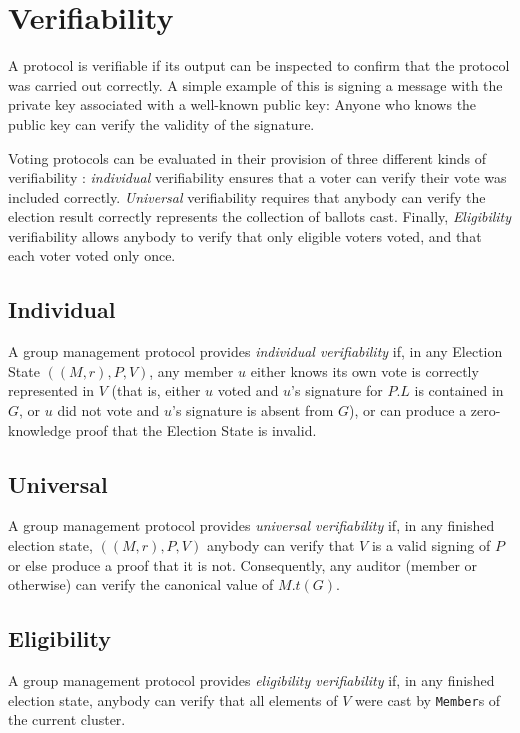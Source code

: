 \section{Verifiability}\label{Subsection:verif}
A protocol is verifiable if its output can be inspected to confirm that the
protocol was carried out correctly. A simple example of this is signing a
message with the private key associated with a well-known public key: Anyone
who knows the public key can verify the validity of the signature.

Voting protocols can be evaluated in their provision of three different
kinds of verifiability \cite{kremer_election_2010}: \emph{individual}
verifiability ensures that a voter can verify their vote was included
correctly. \emph{Universal} verifiability requires that anybody can verify
the election result correctly represents the collection of ballots cast.
Finally, \emph{Eligibility} verifiability allows anybody to verify that
only eligible voters voted, and that each voter voted only once.

  \subsection{Individual}
  A group management protocol provides \emph{individual verifiability} if, in
  any Election State $((M,r), P, V)$, any member $u$
  either knows its own vote is correctly represented in $V$ (that is, either
  $u$ voted and $u$'s
  signature for $P.L$ is contained in $G$,
  or $u$ did not vote and $u$'s signature is absent from $G$), or can produce
  a zero-knowledge proof that the Election State is invalid.

  \subsection{Universal}
  A group management protocol provides \emph{universal verifiability} if, in
  any finished election state, $((M,r), P, V)$%
  anybody can verify that $V$ is a valid signing of $P$ or else produce a
  proof that it is not. Consequently, any auditor (member or otherwise) can
  verify the canonical value of $M.t(G)$.

  \subsection{Eligibility}
  A group management protocol provides \emph{eligibility verifiability} if, in
  any finished election state, anybody can verify that all elements of $V$
  were cast by \texttt{Member}s of the current cluster.

